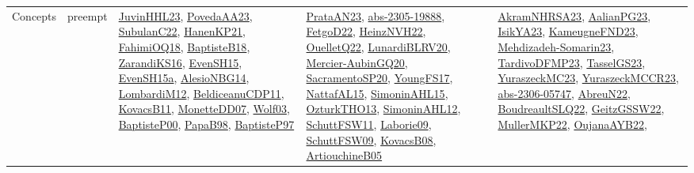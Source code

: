 {\begin{longtable}{lp{3cm}>{\raggedright}p{6cm}>{\raggedright}p{6cm}p{8cm}}
Concepts & preempt & \href{papers/JuvinHHL23.pdf}{JuvinHHL23}\cite{JuvinHHL23}, \href{papers/PovedaAA23.pdf}{PovedaAA23}\cite{PovedaAA23}, \href{articles/SubulanC22.pdf}{SubulanC22}\cite{SubulanC22}, \href{papers/HanenKP21.pdf}{HanenKP21}\cite{HanenKP21}, \href{articles/FahimiOQ18.pdf}{FahimiOQ18}\cite{FahimiOQ18}, \href{articles/BaptisteB18.pdf}{BaptisteB18}\cite{BaptisteB18}, \href{articles/ZarandiKS16.pdf}{ZarandiKS16}\cite{ZarandiKS16}, \href{papers/EvenSH15.pdf}{EvenSH15}\cite{EvenSH15}, \href{articles/EvenSH15a.pdf}{EvenSH15a}\cite{EvenSH15a}, \href{papers/AlesioNBG14.pdf}{AlesioNBG14}\cite{AlesioNBG14}, \href{articles/LombardiM12.pdf}{LombardiM12}\cite{LombardiM12}, \href{articles/BeldiceanuCDP11.pdf}{BeldiceanuCDP11}\cite{BeldiceanuCDP11}, \href{articles/KovacsB11.pdf}{KovacsB11}\cite{KovacsB11}, \href{papers/MonetteDD07.pdf}{MonetteDD07}\cite{MonetteDD07}, \href{papers/Wolf03.pdf}{Wolf03}\cite{Wolf03}, \href{articles/BaptisteP00.pdf}{BaptisteP00}\cite{BaptisteP00}, \href{articles/PapaB98.pdf}{PapaB98}\cite{PapaB98}, \href{papers/BaptisteP97.pdf}{BaptisteP97}\cite{BaptisteP97} & \href{articles/PrataAN23.pdf}{PrataAN23}\cite{PrataAN23}, \href{articles/abs-2305-19888.pdf}{abs-2305-19888}\cite{abs-2305-19888}, \href{articles/FetgoD22.pdf}{FetgoD22}\cite{FetgoD22}, \href{articles/HeinzNVH22.pdf}{HeinzNVH22}\cite{HeinzNVH22}, \href{papers/OuelletQ22.pdf}{OuelletQ22}\cite{OuelletQ22}, \href{articles/LunardiBLRV20.pdf}{LunardiBLRV20}\cite{LunardiBLRV20}, \href{papers/Mercier-AubinGQ20.pdf}{Mercier-AubinGQ20}\cite{Mercier-AubinGQ20}, \href{articles/SacramentoSP20.pdf}{SacramentoSP20}\cite{SacramentoSP20}, \href{papers/YoungFS17.pdf}{YoungFS17}\cite{YoungFS17}, \href{articles/NattafAL15.pdf}{NattafAL15}\cite{NattafAL15}, \href{articles/SimoninAHL15.pdf}{SimoninAHL15}\cite{SimoninAHL15}, \href{articles/OzturkTHO13.pdf}{OzturkTHO13}\cite{OzturkTHO13}, \href{papers/SimoninAHL12.pdf}{SimoninAHL12}\cite{SimoninAHL12}, \href{articles/SchuttFSW11.pdf}{SchuttFSW11}\cite{SchuttFSW11}, \href{papers/Laborie09.pdf}{Laborie09}\cite{Laborie09}, \href{papers/SchuttFSW09.pdf}{SchuttFSW09}\cite{SchuttFSW09}, \href{articles/KovacsB08.pdf}{KovacsB08}\cite{KovacsB08}, \href{papers/ArtiouchineB05.pdf}{ArtiouchineB05}\cite{ArtiouchineB05} & \href{articles/AkramNHRSA23.pdf}{AkramNHRSA23}\cite{AkramNHRSA23}, \href{papers/AalianPG23.pdf}{AalianPG23}\cite{AalianPG23}, \href{articles/IsikYA23.pdf}{IsikYA23}\cite{IsikYA23}, \href{papers/KameugneFND23.pdf}{KameugneFND23}\cite{KameugneFND23}, \href{papers/Mehdizadeh-Somarin23.pdf}{Mehdizadeh-Somarin23}\cite{Mehdizadeh-Somarin23}, \href{papers/TardivoDFMP23.pdf}{TardivoDFMP23}\cite{TardivoDFMP23}, \href{papers/TasselGS23.pdf}{TasselGS23}\cite{TasselGS23}, \href{papers/YuraszeckMC23.pdf}{YuraszeckMC23}\cite{YuraszeckMC23}, \href{articles/YuraszeckMCCR23.pdf}{YuraszeckMCCR23}\cite{YuraszeckMCCR23}, \href{articles/abs-2306-05747.pdf}{abs-2306-05747}\cite{abs-2306-05747}, \href{articles/AbreuN22.pdf}{AbreuN22}\cite{AbreuN22}, \href{papers/BoudreaultSLQ22.pdf}{BoudreaultSLQ22}\cite{BoudreaultSLQ22}, \href{papers/GeitzGSSW22.pdf}{GeitzGSSW22}\cite{GeitzGSSW22}, \href{articles/MullerMKP22.pdf}{MullerMKP22}\cite{MullerMKP22}, \href{papers/OujanaAYB22.pdf}{OujanaAYB22}\cite{OujanaAYB22}, 
\end{longtable}}
